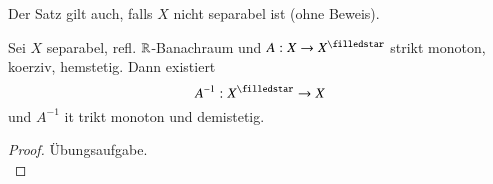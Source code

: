 \begin{remark}
    Der Satz gilt auch, falls $X$ nicht separabel ist (ohne Beweis).
\end{remark}

\begin{cor}\label{4.7}
    Sei $X$ separabel, refl. $\mathbb{R}$-Banachraum und $A:X\ra X^\star$ strikt monoton, koerziv, hemstetig.
    Dann existiert
    \[
        A^{-1}:X^\star\ra X
    \]
    und $A^{-1}$ it trikt monoton und demistetig.
\end{cor}

\begin{proof}
    Übungsaufgabe. \[ \]
\end{proof}
